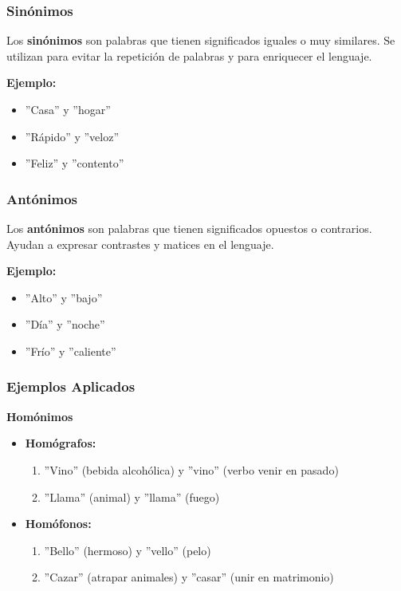 \subsubsection{Sinónimos}

Los \textbf{sinónimos} son palabras que tienen significados iguales o muy similares. Se utilizan para evitar la repetición de palabras y para enriquecer el lenguaje.

\textbf{Ejemplo:}

\begin{itemize}
      \item ''Casa'' y ''hogar''
      \item ''Rápido'' y ''veloz''
      \item ''Feliz'' y ''contento''
\end{itemize}

\subsubsection{Antónimos}

Los \textbf{antónimos} son palabras que tienen significados opuestos o contrarios. Ayudan a expresar contrastes y matices en el lenguaje.

\textbf{Ejemplo:}

\begin{itemize}
      \item ''Alto'' y ''bajo''
      \item ''Día'' y ''noche''
      \item ''Frío'' y ''caliente''
\end{itemize}

\subsubsection{Ejemplos Aplicados}

\textbf{Homónimos}
\begin{itemize}
      \item \textbf{Homógrafos:}
            \begin{enumerate}
                  \item ''Vino'' (bebida alcohólica) y ''vino'' (verbo venir en pasado)
                  \item ''Llama'' (animal) y ''llama'' (fuego)
            \end{enumerate}
      \item \textbf{Homófonos:}
            \begin{enumerate}
                  \item ''Bello'' (hermoso) y ''vello'' (pelo)
                  \item ''Cazar'' (atrapar animales) y ''casar'' (unir en matrimonio)
            \end{enumerate}
\end{itemize}

